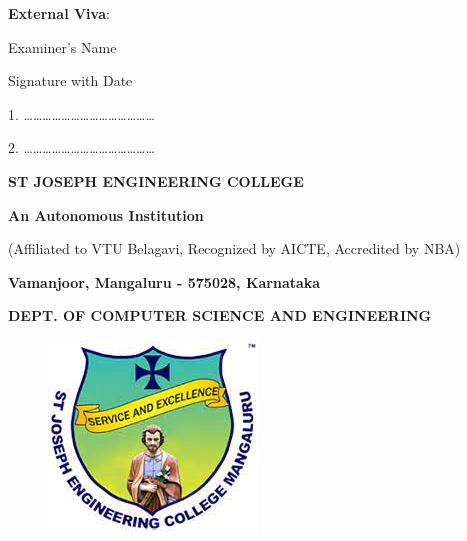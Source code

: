 \documentclass[12pt,a4paper]{report}
\begin{document}
\begin{center}
    \large \textbf{External Viva}:
\end{center}
\begin{flushleft}
    \begin{normalsize}Examiner's Name \end{normalsize}
    \hspace{6.5cm}
    \begin{normalsize}Signature with Date\end{normalsize}
\end{flushleft}
\vspace{0.1in}
\begin{flushleft}
    1. \ldots\ldots\ldots\ldots\ldots\ldots \ldots \hspace{5.8cm}\ldots\ldots\ldots\ldots \ldots\ldots\ldots
    \par
    \vspace{0.2in}
    2. \ldots\ldots\ldots\ldots\ldots\ldots \ldots \hspace{5.8cm}\ldots\ldots\ldots\ldots \ldots\ldots\ldots
\end{flushleft}
\newpage

\centering
\LARGE \textbf{ST JOSEPH ENGINEERING COLLEGE}
\par
\Large \textbf{An Autonomous Institution}
\par \large{(Affiliated to VTU Belagavi, Recognized by AICTE, Accredited by NBA)}
\par \vspace{3pt}
\large \textbf{Vamanjoor, Mangaluru - 575028, Karnataka}
\par \vspace{12pt}
\par
\large \textbf{DEPT. OF COMPUTER SCIENCE AND ENGINEERING}
\par
\begin{figure}[hbtp]
    \centering
    \includegraphics[scale=0.5]{./pic/sjeclogo}
\end{figure}
\end{document}
